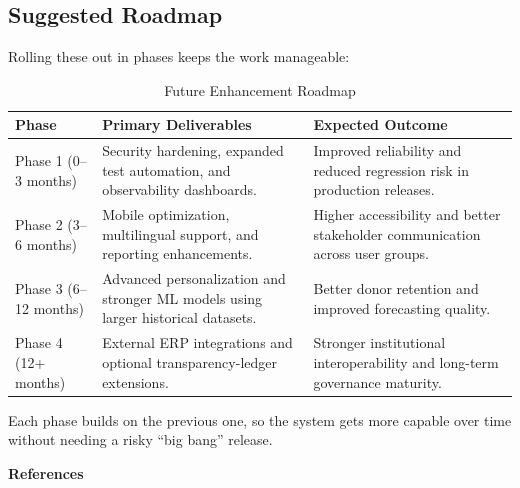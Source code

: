 \documentclass{thesis-library}
\begin{document}
\subsection{Suggested Roadmap}
Rolling these out in phases keeps the work manageable:

\begin{table}[H]
    \centering
    \caption{Future Enhancement Roadmap}
    \vspace{10pt}
    \begin{tabularx}{\linewidth}{|P{3cm}|P{5.5cm}|L|}
        \hline
        \textbf{Phase} & \textbf{Primary Deliverables} & \textbf{Expected Outcome} \\
        \hline
        Phase 1 (0--3 months) & Security hardening, expanded test automation, and observability dashboards. & Improved reliability and reduced regression risk in production releases. \\
        \hline
        Phase 2 (3--6 months) & Mobile optimization, multilingual support, and reporting enhancements. & Higher accessibility and better stakeholder communication across user groups. \\
        \hline
        Phase 3 (6--12 months) & Advanced personalization and stronger ML models using larger historical datasets. & Better donor retention and improved forecasting quality. \\
        \hline
        Phase 4 (12+ months) & External ERP integrations and optional transparency-ledger extensions. & Stronger institutional interoperability and long-term governance maturity. \\
        \hline
    \end{tabularx}
\end{table}

Each phase builds on the previous one, so the system gets more capable over time without needing a risky ``big bang'' release.

\renewcommand{\bibname}{References}

\cleardoublepage
\thispagestyle{empty}

\vspace*{\fill}
\begin{center}
    \Huge \bfseries References
\end{center}
\vspace*{\fill}





\end{document}
